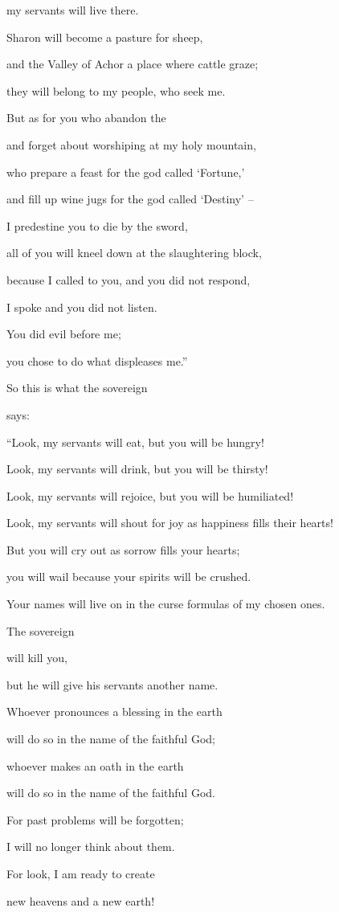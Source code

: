 {\par }{\Q my servants
will live
there.
\par }{\Q {}Sharon
will become
a pasture
for sheep,
\par }{\Q and the Valley
of Achor
a place
where cattle
graze;

\par }{\Q they will belong to my people,
who
seek me.
\par }{\Q {}But as for you
who abandon
the {}
\par }{\Q and forget
about worshiping at my holy
mountain,
\par }{\Q who prepare
a feast
for the god called ‘Fortune,’
\par }{\Q and fill
up wine jugs
for the god called ‘Destiny’ –
\par }{\Q {}I predestine
you to die by the sword,
\par }{\Q all
of you will kneel down
at the slaughtering block,
\par }{\Q because
I called
to you, and you did not
respond,
\par }{\Q I spoke
and you did not
listen.
\par }{\Q You did
evil
before me;
\par }{\Q you chose
to do what displeases me.”
\par }{\Q {}So
this is what
the sovereign

{}
says:
\par }{\Q “Look,
my servants
will eat,
but you
will be hungry!
\par }{\Q Look,
my servants
will drink,
but you
will be thirsty!
\par }{\Q Look,
my servants
will rejoice,
but you
will be humiliated!
\par }{\Q {}Look,
my servants
will shout for joy
as happiness fills
their hearts!

\par }{\Q But you
will cry out
as sorrow
fills your hearts;
\par }{\Q you will wail
because your spirits
will be crushed.
\par }{\Q {}Your names
will live on
in the curse formulas
of my chosen ones.
\par }{\Q The sovereign

{}
will kill
you,
\par }{\Q but he will give
his servants
another
name.
\par }{\Q {}Whoever
pronounces a blessing
in the earth
\par }{\Q will do so
in the name of the faithful
God;
\par }{\Q whoever makes an oath
in the earth
\par }{\Q will do so
in the name of the faithful
God.
\par }{\Q For
past
problems
will be forgotten;
\par }{\Q I will no longer think about them.
\par }{\Q {}For
look,
I am ready to create
\par }{\Q new
heavens
and a new
earth!

}
